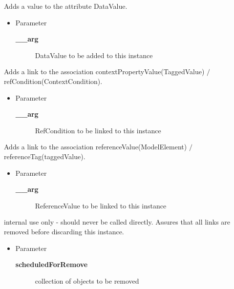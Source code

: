 \methods
{}
\begin{desc}Adds a value to the attribute DataValue.
\begin{itemize}
\item{Parameter
  \begin{description}
   \item[{\bf \_\_arg}]{DataValue to be added to this instance}
  \end{description}}
\end{itemize}
\end{desc}

\begin{desc}Adds a link to the association contextPropertyValue(TaggedValue)
 $/$ refCondition(ContextCondition).
\begin{itemize}
\item{Parameter
  \begin{description}
   \item[{\bf \_\_arg}]{RefCondition to be linked to this instance}
  \end{description}}
\end{itemize}
\end{desc}

\begin{desc}Adds a link to the association referenceValue(ModelElement)
 $/$ referenceTag(taggedValue).
\begin{itemize}
\item{Parameter
  \begin{description}
   \item[{\bf \_\_arg}]{ReferenceValue to be linked to this instance}
  \end{description}}
\end{itemize}
\end{desc}

\begin{desc}internal use only - should never be called directly.
 Assures that all links are removed before
 discarding this instance.
\begin{itemize}
\item{Parameter
  \begin{description}
   \item[{\bf scheduledForRemove}]{collection of objects to be removed}
  \end{description}}
\end{itemize}
\end{desc}

